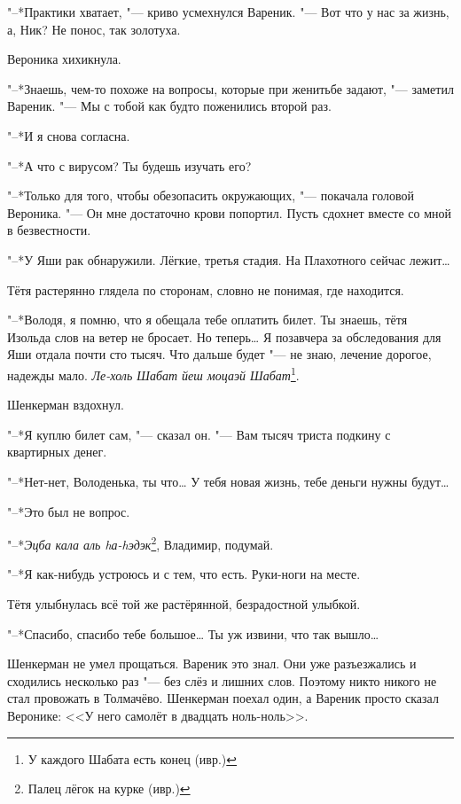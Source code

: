 "--*Практики хватает, "--- криво усмехнулся Вареник.
"--- Вот что у нас за жизнь, а, Ник?
Не понос, так золотуха.

Вероника хихикнула.

"--*Знаешь, чем-то похоже на вопросы, которые при женитьбе задают, "--- заметил Вареник.
"--- Мы с тобой как будто поженились второй раз.

"--*И я снова согласна.

"--*А что с вирусом?
Ты будешь изучать его?

"--*Только для того, чтобы обезопасить окружающих, "--- покачала головой Вероника.
"--- Он мне достаточно крови попортил.
Пусть сдохнет вместе со мной в безвестности.

\asterism

\textspace

"--*У Яши рак обнаружили.
Лёгкие, третья стадия.
На Плахотного сейчас лежит\dots{}

Тётя растерянно глядела по сторонам, словно не понимая, где находится.

"--*Володя, я помню, что я обещала тебе оплатить билет.
Ты знаешь, тётя Изольда слов на ветер не бросает.
Но теперь\dots{}
Я позавчера за обследования для Яши отдала почти сто тысяч.
Что дальше будет "--- не знаю, лечение дорогое, надежды мало.
\textit{Ле-холь Шабат йеш моцаэй Шабат}\footnote{У каждого Шабата есть конец (ивр.)}.

Шенкерман вздохнул.

"--*Я куплю билет сам, "--- сказал он.
"--- Вам тысяч триста подкину с квартирных денег.

"--*Нет-нет, Володенька, ты что\dots{}
У тебя новая жизнь, тебе деньги нужны будут\dots{}

"--*Это был не вопрос.

"--*\textit{Эцба кала аль hа-hэдэк}\footnote{Палец лёгок на курке (ивр.)}, Владимир, подумай.

"--*Я как-нибудь устроюсь и с тем, что есть.
Руки-ноги на месте.

Тётя улыбнулась всё той же растёрянной, безрадостной улыбкой.

"--*Спасибо, спасибо тебе большое\dots{}
Ты уж извини, что так вышло\dots{}

\asterism

\label{Fri_2012_10_19}

Шенкерман не умел прощаться.
Вареник это знал.
Они уже разъезжались и сходились несколько раз "--- без слёз и лишних слов.
Поэтому никто никого не стал провожать в Толмачёво.
Шенкерман поехал один, а Вареник просто сказал Веронике:
<<У него самолёт в двадцать ноль-ноль>>.

